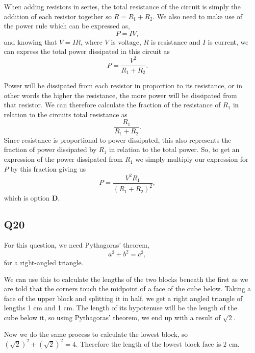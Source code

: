 \documentclass[11pt]{article}
\begin{document}
When adding resistors in series, the total resistance of the circuit is simply the addition of each resistor together so $R=R_1+R_2$.  We also need to make use of the power rule which can be expressed as,
\begin{equation*}
P = IV,
\end{equation*}
and knowing that $V=IR$, where $V$ is voltage, $R$ is resistance and $I$ is current, we can express the total power dissipated in this circuit as
\begin{equation*}
P=\frac{V^2}{R_1 + R_2}.
\end{equation*}

Power will be dissipated from each resistor in proportion to its resistance, or in other words the higher the resistance, the more power will be dissipated from that resistor.  We can therefore calculate the fraction of the resistance of $R_1$ in relation to the circuits total resistance as 
\begin{equation*}
\frac{R_1}{R_1+R_2}.
\end{equation*}
Since resistance is proportional to power dissipated, this also represents the fraction of power dissipated by $R_1$ in relation to the total power.  So, to get an expression of the power dissipated from $R_1$ we simply multiply our expression for $P$ by this fraction giving us
\begin{equation*}
P = \frac{V^2R_1}{(R_1 + R_2)^2},
\end{equation*}
which is option \textbf{D}.

\subsection*{Q20}
For this question, we need Pythagoras' theorem,
\begin{equation*}
a^2 + b^2 = c^2,
\end{equation*}
for a right-angled triangle.

We can use this to calculate the lengths of the two blocks beneath the first as we are told that the corners touch the midpoint of a face of the cube below.  Taking a face of the upper block and splitting it in half, we get a right angled triangle of lengths 1 cm and 1 cm.  The length of its hypotenuse will be the length of the cube below it, so using Pythagoras' theorem, we end up with a result of $\sqrt{2}$.  

Now we do the same process to calculate the lowest block, so $(\sqrt2)^2 + (\sqrt{2})^2 = 4$.  Therefore the length of the lowest block face is 2 cm.
\end{document}
